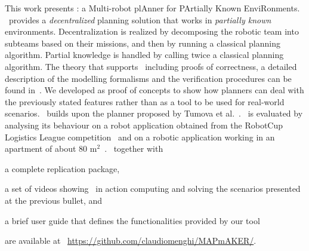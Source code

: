 This work presents  \toolName: a Multi-robot plAnner for PArtially Known EnviRonments.
 \toolName\ provides a  \emph{decentralized} planning solution that works in \emph{partially known} environments.
Decentralization is realized by decomposing the robotic team into subteams based on their missions, and then by running a classical planning algorithm.
Partial knowledge is handled by calling twice a classical planning algorithm.
The theory that supports \toolName\ including proofs of correctness, a detailed description of the modelling formalisms and the verification procedures can be found in~\cite{menghi2018multi}.
We developed \toolName as proof of concepts to show how planners can deal with the previously stated features rather than as a tool to be used for real-world scenarios.
\toolName~builds upon the planner proposed by Tumova et al.~\cite{tumova2016multi}.
\toolName\ is evaluated by analysing its behaviour on a robot application obtained from the RobotCup Logistics League competition~\cite{karrasrobocup} and on a robotic application working in an apartment of about 80 m$^2$~\cite{map}.
\toolName\  together with 
\begin{enumerate*}
\item a complete replication package,
\item a set of videos showing \toolName\ in action computing and solving the scenarios presented at the previous bullet, and
\item a brief user guide that defines the functionalities provided by our tool
\end{enumerate*}
 are available at ~\url{https://github.com/claudiomenghi/MAPmAKER/}. 


